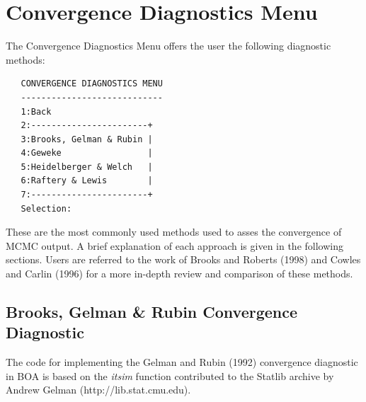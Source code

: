 \documentclass[12pt,letterpaper]{report}
\begin{document}
\section{Convergence Diagnostics Menu}
\noindent
The Convergence Diagnostics Menu offers the user the following diagnostic
methods:
\vskip 9pt
\begin{tiny}
\begin{verbatim}
   CONVERGENCE DIAGNOSTICS MENU
   ----------------------------
   1:Back
   2:-----------------------+
   3:Brooks, Gelman & Rubin |
   4:Geweke                 |
   5:Heidelberger & Welch   |
   6:Raftery & Lewis        |
   7:-----------------------+
   Selection:
\end{verbatim}
\end{tiny}
These are the most commonly used methods used to asses the convergence of MCMC
output. A brief explanation of each approach is given in the following sections.
Users are referred to the work of Brooks and Roberts (1998) and Cowles and
Carlin (1996) for a more in-depth review and comparison of these methods.

\subsection{Brooks, Gelman \& Rubin Convergence Diagnostic}
\label{ssec.bandg}
\noindent
The code for implementing the Gelman and Rubin (1992) convergence diagnostic in
BOA is based on the {\it itsim} function contributed to the Statlib archive by
Andrew Gelman (http://lib.stat.cmu.edu).
\end{document}
